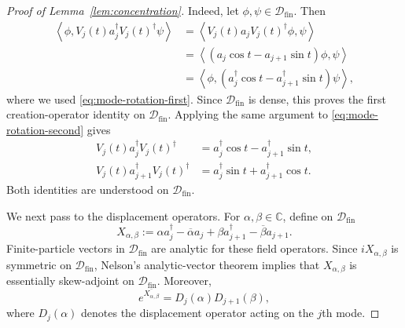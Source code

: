 \documentclass{article}
\theoremstyle{named}
\theoremstyle{named1}
\newcommand{\bbC}{\mathbb C}
\theoremstyle{plain}
\theoremstyle{remark}
\begin{document}
\begin{proof}[Proof of Lemma~\ref{lem:concentration}]
Indeed, let $\phi,\psi\in\mathscr D_{\mathrm{fin}}$. Then
\begin{align*}
\left\langle
    \phi,
    V_j(t)a_j^\dagger V_j(t)^\dagger\psi
\right\rangle
&=
\left\langle
    V_j(t)a_jV_j(t)^\dagger\phi,
    \psi
\right\rangle\\
&=
\left\langle
    (a_j\cos t-a_{j+1}\sin t)\phi,
    \psi
\right\rangle\\
&=
\left\langle
    \phi,
    (a_j^\dagger\cos t-a_{j+1}^\dagger\sin t)\psi
\right\rangle,
\end{align*}
where we used \eqref{eq:mode-rotation-first}. 
Since $\mathscr D_{\mathrm{fin}}$ is dense, this proves the first
creation-operator identity on $\mathscr D_{\mathrm{fin}}$.
Applying the same argument to \eqref{eq:mode-rotation-second} gives
\begin{align}
    V_j(t)a_j^\dagger V_j(t)^\dagger
    &=
    a_j^\dagger\cos t-a_{j+1}^\dagger\sin t,
    \label{eq:creation-rotation-first}\\
    V_j(t)a_{j+1}^\dagger V_j(t)^\dagger
    &=
    a_j^\dagger\sin t+a_{j+1}^\dagger\cos t.
    \label{eq:creation-rotation-second}
\end{align}
Both identities are understood on $\mathscr D_{\mathrm{fin}}$.



We next pass to the displacement operators.  For
$\alpha,\beta\in\bbC$, define on $\mathscr D_{\mathrm{fin}}$
\[
    X_{\alpha,\beta}
    :=
    \alpha a_j^\dagger-\overline{\alpha}a_j
    +
    \beta a_{j+1}^\dagger-\overline{\beta}a_{j+1}.
\]
Finite-particle vectors in $\mathscr D_{\mathrm{fin}}$ are analytic for
these field operators. Since $iX_{\alpha,\beta}$ is symmetric on
$\mathscr D_{\mathrm{fin}}$, Nelson's analytic-vector theorem
\cite[Theorem~X.39]{ReedSimonII} implies that
$X_{\alpha,\beta}$ is essentially skew-adjoint on
$\mathscr D_{\mathrm{fin}}$. Moreover,
\[
    e^{\overline{X_{\alpha,\beta}}}
    =
    D_j(\alpha)D_{j+1}(\beta),
\]
where $D_j(\alpha)$ denotes the displacement operator acting on the
$j$th mode.


\end{proof}
\end{document}
